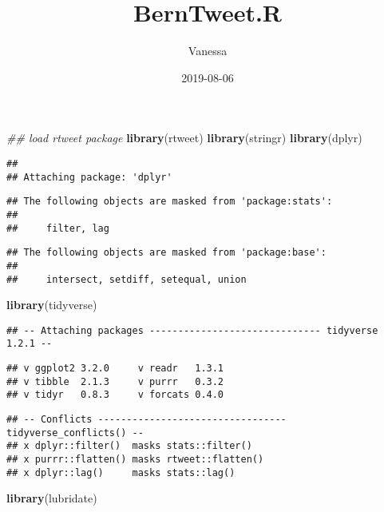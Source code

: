 \documentclass[]{article}
\title{BernTweet.R}
\author{Vanessa}
\date{2019-08-06}
\newenvironment{Shaded}{\begin{snugshade}}{\end{snugshade}}
\newcommand{\CommentTok}[1]{\textcolor[rgb]{0.56,0.35,0.01}{\textit{#1}}}
\newcommand{\KeywordTok}[1]{\textcolor[rgb]{0.13,0.29,0.53}{\textbf{#1}}}
\newcommand{\NormalTok}[1]{#1}
\begin{document}
\maketitle

\begin{Shaded}
\begin{Highlighting}[]
\CommentTok{## load rtweet package}
\KeywordTok{library}\NormalTok{(rtweet)}
\KeywordTok{library}\NormalTok{(stringr)}
\KeywordTok{library}\NormalTok{(dplyr)}
\end{Highlighting}
\end{Shaded}

\begin{verbatim}
## 
## Attaching package: 'dplyr'
\end{verbatim}

\begin{verbatim}
## The following objects are masked from 'package:stats':
## 
##     filter, lag
\end{verbatim}

\begin{verbatim}
## The following objects are masked from 'package:base':
## 
##     intersect, setdiff, setequal, union
\end{verbatim}

\begin{Shaded}
\begin{Highlighting}[]
\KeywordTok{library}\NormalTok{(tidyverse)}
\end{Highlighting}
\end{Shaded}

\begin{verbatim}
## -- Attaching packages ------------------------------ tidyverse 1.2.1 --
\end{verbatim}

\begin{verbatim}
## v ggplot2 3.2.0     v readr   1.3.1
## v tibble  2.1.3     v purrr   0.3.2
## v tidyr   0.8.3     v forcats 0.4.0
\end{verbatim}

\begin{verbatim}
## -- Conflicts --------------------------------- tidyverse_conflicts() --
## x dplyr::filter()  masks stats::filter()
## x purrr::flatten() masks rtweet::flatten()
## x dplyr::lag()     masks stats::lag()
\end{verbatim}

\begin{Shaded}
\begin{Highlighting}[]
\KeywordTok{library}\NormalTok{(lubridate)}
\end{Highlighting}
\end{Shaded}
\end{document}
